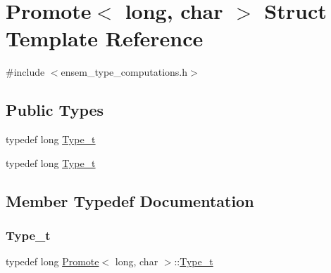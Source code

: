 \hypertarget{structPromote_3_01long_00_01char_01_4}{}\section{Promote$<$ long, char $>$ Struct Template Reference}
\label{structPromote_3_01long_00_01char_01_4}


{\ttfamily \#include $<$ensem\+\_\+type\+\_\+computations.\+h$>$}

\subsection*{Public Types}
\begin{DoxyCompactItemize}
\item 
typedef long \mbox{\hyperlink{structPromote_3_01long_00_01char_01_4_a04c143edd9915a489849f8e7da76543d}{Type\+\_\+t}}
\item 
typedef long \mbox{\hyperlink{structPromote_3_01long_00_01char_01_4_a04c143edd9915a489849f8e7da76543d}{Type\+\_\+t}}
\end{DoxyCompactItemize}


\subsection{Member Typedef Documentation}
\mbox{\label{structPromote_3_01long_00_01char_01_4_a04c143edd9915a489849f8e7da76543d}} 
\subsubsection{\texorpdfstring{Type\_t}{Type\_t}\hspace{0.1cm}{\footnotesize\ttfamily [1/2]}}
{\footnotesize\ttfamily typedef long \mbox{\hyperlink{structPromote}{Promote}}$<$ long, char $>$\+::\mbox{\hyperlink{structPromote_3_01long_00_01char_01_4_a04c143edd9915a489849f8e7da76543d}{Type\+\_\+t}}}

\mbox{\label{structPromote_3_01long_00_01char_01_4_a04c143edd9915a489849f8e7da76543d}} 
